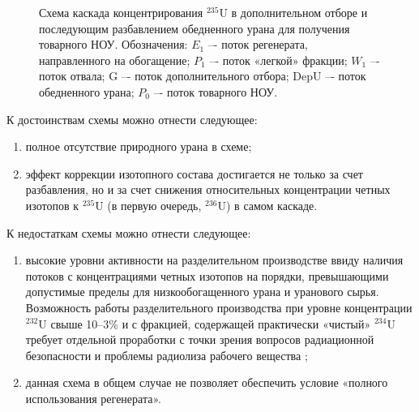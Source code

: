 \begin{figure}[ht]
  \caption{Схема каскада концентрирования $^{235}$U в дополнительном отборе и последующим разбавлением обедненного урана для получения товарного НОУ. Обозначения: $E_1$ –- поток регенерата, направленного на обогащение; $P_1$ –- поток «легкой» фракции; $W_1$ –- поток отвала; G –- поток дополнительного отбора; DepU –- поток обедненного урана; $P_0$ –- поток товарного НОУ.
  }\label{fig:enl}
\end{figure}


К достоинствам схемы можно отнести следующее:

\begin{enumerate}
  \item полное отсутствие природного урана в схеме;
  \item эффект коррекции изотопного состава достигается не только за счет разбавления, но и за счет снижения относительных концентрации четных изотопов к $^{235}$U (в первую очередь, $^{236}$U) в самом каскаде.
\end{enumerate}

К недостаткам схемы можно отнести следующее:
\begin{enumerate}
  \item высокие уровни активности на разделительном производстве ввиду наличия потоков с концентрациями четных изотопов на порядки, превышающими допустимые пределы для низкообогащенного урана и уранового сырья. Возможность работы разделительного производства при уровне концентрации $^{232}$U свыше 10--3\% и с фракцией, содержащей практически «чистый» $^{234}$U требует отдельной проработки с точки зрения вопросов радиационной безопасности и проблемы радиолиза рабочего вещества \cite{belovRADIOLIZOBOGAShchENNOGO2322019}; 
  \item данная схема в общем случае не позволяет обеспечить условие «полного использования регенерата».
\end{enumerate}



